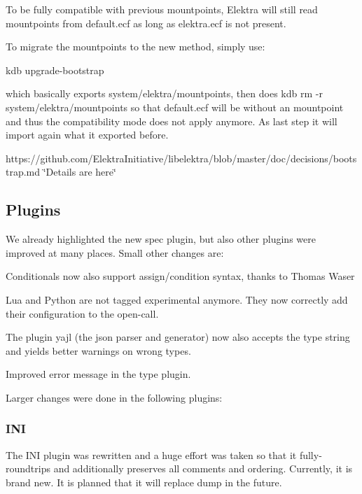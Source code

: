 To be fully compatible with previous mountpoints, Elektra will still read mountpoints from {\ttfamily default.\+ecf} as long as {\ttfamily elektra.\+ecf} is not present.

To migrate the mountpoints to the new method, simply use\+: \begin{DoxyVerb}kdb upgrade-bootstrap
\end{DoxyVerb}


which basically exports {\ttfamily system/elektra/mountpoints}, then does {\ttfamily kdb rm -\/r system/elektra/mountpoints} so that {\ttfamily default.\+ecf} will be without an mountpoint and thus the compatibility mode does not apply anymore. As last step it will import again what it exported before.

https\+://github.com/\+Elektra\+Initiative/libelektra/blob/master/doc/decisions/bootstrap.\+md \char`\"{}\+Details are here\char`\"{}

\subsection*{Plugins}

We already highlighted the new {\ttfamily spec} plugin, but also other plugins were improved at many places. Small other changes are\+:


\begin{DoxyItemize}
\item Conditionals now also support {\ttfamily assign/condition} syntax, thanks to Thomas Waser
\item Lua and Python are not tagged experimental anymore. They now correctly add their configuration to the open-\/call.
\item The plugin {\ttfamily yajl} (the json parser and generator) now also accepts the type {\ttfamily string} and yields better warnings on wrong types.
\item Improved error message in the {\ttfamily type} plugin.
\end{DoxyItemize}

Larger changes were done in the following plugins\+:

\subsubsection*{I\+NI}

The I\+NI plugin was rewritten and a huge effort was taken so that it fully-\/roundtrips and additionally preserves all comments and ordering. Currently, it is brand new. It is planned that it will replace {\ttfamily dump} in the future.

